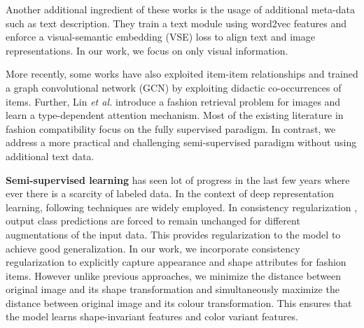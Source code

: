 \documentclass[sigconf]{acmart}
\newcommand{\etal}{\textit{et al.}}
\begin{document}
\vspace{0.5mm}

Another additional ingredient of these works \cite{bilstm,eccv2018learning,iccv2019learning} is the usage of additional meta-data such as text description. They train a text module using word2vec features \cite{mikolov2013distributed} and enforce a visual-semantic embedding (VSE) loss to align text and image representations. In our work, we focus on only visual information. 

\vspace{0.5mm}

More recently, some works \cite{cucurull2019context,yang2020learning,Duannips} have also exploited item-item relationships and trained a graph convolutional network (\textsc{GCN}) by exploiting didactic co-occurrences of items. Further, Lin \etal \cite{cvpr2020fashion} introduce a fashion retrieval problem for images and learn a type-dependent attention mechanism. Most of the existing literature in fashion compatibility focus on the fully supervised paradigm. In contrast, we address a more practical and challenging semi-supervised paradigm without using additional text data. 

\vspace{1mm}
\noindent \textbf{Semi-supervised learning} has seen lot of progress \cite{berthelot2019mixmatch,yun2019cutmix,verma2019interpolation} in the last few years where ever there is a scarcity of labeled data. In the context of deep representation learning, following techniques are widely employed. In consistency regularization \cite{ouali2020semi,cubuk2018autoaugment}, output class predictions are forced to remain unchanged for different augmentations of the input data. This provides regularization to the model to achieve good generalization. In our work, we incorporate consistency regularization to explicitly capture appearance and shape attributes for fashion items. However unlike previous approaches, we minimize the distance between original image and its shape transformation and simultaneously maximize the distance between original image and its colour transformation. This ensures that the model learns shape-invariant features and color variant features.

\vspace{0.75mm}
\end{document}
